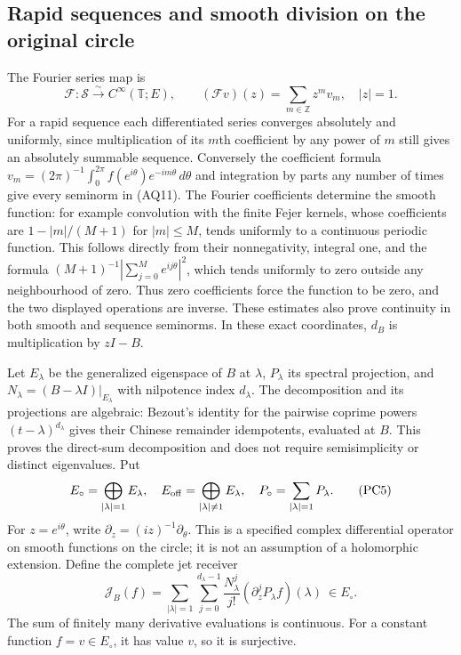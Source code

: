 \subsection{Rapid sequences and smooth division on the original circle}
The Fourier series map is
\[
 \mathcal F:\mathscr S\xrightarrow{\sim}C^\infty(\mathbb T;E),
 \qquad (\mathcal Fv)(z)=\sum_{m\in\mathbb Z}z^mv_m,
 \quad |z|=1.
 \tag{PC4}
\]
For a rapid sequence each differentiated series converges absolutely
and uniformly, since multiplication of its $m$th coefficient by any
power of $m$ still gives an absolutely summable sequence. Conversely
the coefficient formula
$v_m=(2\pi)^{-1}\int_0^{2\pi}f(e^{i\theta})e^{-im\theta}\,d\theta$
and integration by parts any number of times give every seminorm in
(AQ11). The Fourier coefficients determine the smooth function: for
example convolution with the finite Fejer kernels, whose coefficients
are $1-|m|/(M+1)$ for $|m|\le M$, tends uniformly to a continuous
periodic function. This follows directly from their nonnegativity,
integral one, and the formula
$(M+1)^{-1}|\sum_{j=0}^Me^{ij\theta}|^2$, which tends uniformly to
zero outside any neighbourhood of zero. Thus zero coefficients force
the function to be zero, and the two displayed operations are inverse.
These estimates also prove continuity in both smooth and sequence
seminorms. In these exact coordinates, $d_B$ is multiplication by
$zI-B$.

Let $E_\lambda$ be the generalized eigenspace of $B$ at $\lambda$,
$P_\lambda$ its spectral projection, and
$N_\lambda=(B-\lambda I)|_{E_\lambda}$ with nilpotence index
$d_\lambda$. The decomposition and its projections are algebraic:
Bezout's identity for the pairwise coprime powers
$(t-\lambda)^{d_\lambda}$ gives their Chinese remainder idempotents,
evaluated at $B$. This proves the direct-sum decomposition and does
not require semisimplicity or distinct eigenvalues. Put
\[
 E_\circ=\bigoplus_{|\lambda|=1}E_\lambda,
 \quad E_{\rm off}=\bigoplus_{|\lambda|\ne1}E_\lambda,
 \quad P_\circ=\sum_{|\lambda|=1}P_\lambda.
 \tag{PC5}
\]
For $z=e^{i\theta}$, write $\partial_z=(iz)^{-1}\partial_\theta$.
This is a specified complex differential operator on smooth functions
on the circle; it is not an assumption of a holomorphic extension.
Define the complete jet receiver
\[
 \mathcal J_B(f)=
 \sum_{|\lambda|=1}\sum_{j=0}^{d_\lambda-1}
   \frac{N_\lambda^j}{j!}
   (\partial_z^j P_\lambda f)(\lambda)\ \in E_\circ.
 \tag{PC6}
\]
The sum of finitely many derivative evaluations is continuous. For
a constant function $f=v\in E_\circ$, it has value $v$, so it is
surjective.


